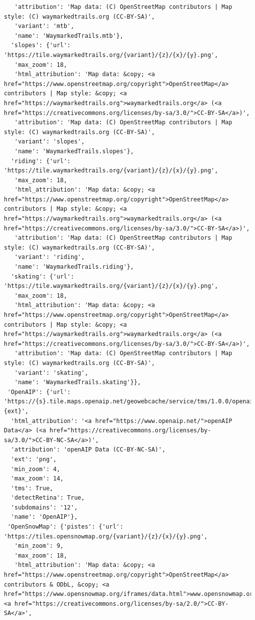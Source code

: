 \documentclass[
  letterpaper,
  DIV=11,
  numbers=noendperiod]{scrreprt}
\begin{document}
\begin{verbatim}
   'attribution': 'Map data: (C) OpenStreetMap contributors | Map style: (C) waymarkedtrails.org (CC-BY-SA)',
   'variant': 'mtb',
   'name': 'WaymarkedTrails.mtb'},
  'slopes': {'url': 'https://tile.waymarkedtrails.org/{variant}/{z}/{x}/{y}.png',
   'max_zoom': 18,
   'html_attribution': 'Map data: &copy; <a href="https://www.openstreetmap.org/copyright">OpenStreetMap</a> contributors | Map style: &copy; <a href="https://waymarkedtrails.org">waymarkedtrails.org</a> (<a href="https://creativecommons.org/licenses/by-sa/3.0/">CC-BY-SA</a>)',
   'attribution': 'Map data: (C) OpenStreetMap contributors | Map style: (C) waymarkedtrails.org (CC-BY-SA)',
   'variant': 'slopes',
   'name': 'WaymarkedTrails.slopes'},
  'riding': {'url': 'https://tile.waymarkedtrails.org/{variant}/{z}/{x}/{y}.png',
   'max_zoom': 18,
   'html_attribution': 'Map data: &copy; <a href="https://www.openstreetmap.org/copyright">OpenStreetMap</a> contributors | Map style: &copy; <a href="https://waymarkedtrails.org">waymarkedtrails.org</a> (<a href="https://creativecommons.org/licenses/by-sa/3.0/">CC-BY-SA</a>)',
   'attribution': 'Map data: (C) OpenStreetMap contributors | Map style: (C) waymarkedtrails.org (CC-BY-SA)',
   'variant': 'riding',
   'name': 'WaymarkedTrails.riding'},
  'skating': {'url': 'https://tile.waymarkedtrails.org/{variant}/{z}/{x}/{y}.png',
   'max_zoom': 18,
   'html_attribution': 'Map data: &copy; <a href="https://www.openstreetmap.org/copyright">OpenStreetMap</a> contributors | Map style: &copy; <a href="https://waymarkedtrails.org">waymarkedtrails.org</a> (<a href="https://creativecommons.org/licenses/by-sa/3.0/">CC-BY-SA</a>)',
   'attribution': 'Map data: (C) OpenStreetMap contributors | Map style: (C) waymarkedtrails.org (CC-BY-SA)',
   'variant': 'skating',
   'name': 'WaymarkedTrails.skating'}},
 'OpenAIP': {'url': 'https://{s}.tile.maps.openaip.net/geowebcache/service/tms/1.0.0/openaip_basemap@EPSG%3A900913@png/{z}/{x}/{y}.{ext}',
  'html_attribution': '<a href="https://www.openaip.net/">openAIP Data</a> (<a href="https://creativecommons.org/licenses/by-sa/3.0/">CC-BY-NC-SA</a>)',
  'attribution': 'openAIP Data (CC-BY-NC-SA)',
  'ext': 'png',
  'min_zoom': 4,
  'max_zoom': 14,
  'tms': True,
  'detectRetina': True,
  'subdomains': '12',
  'name': 'OpenAIP'},
 'OpenSnowMap': {'pistes': {'url': 'https://tiles.opensnowmap.org/{variant}/{z}/{x}/{y}.png',
   'min_zoom': 9,
   'max_zoom': 18,
   'html_attribution': 'Map data: &copy; <a href="https://www.openstreetmap.org/copyright">OpenStreetMap</a> contributors & ODbL, &copy; <a href="https://www.opensnowmap.org/iframes/data.html">www.opensnowmap.org</a> <a href="https://creativecommons.org/licenses/by-sa/2.0/">CC-BY-SA</a>',

\end{verbatim}
\end{document}
